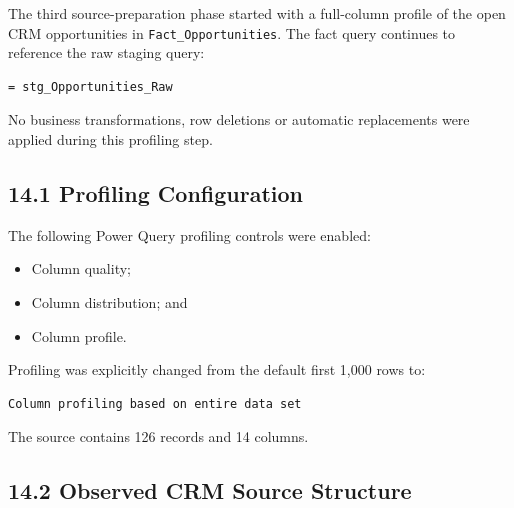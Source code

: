 \documentclass[11pt,a4paper]{article}
\begin{document}
The third source-preparation phase started with a full-column profile of the
open CRM opportunities in \texttt{Fact\_Opportunities}. The fact query
continues to reference the raw staging query:

\begin{lstlisting}[style=powerquery]
= stg_Opportunities_Raw
\end{lstlisting}

No business transformations, row deletions or automatic replacements were
applied during this profiling step.

\subsection{14.1 Profiling Configuration}

The following Power Query profiling controls were enabled:

\begin{itemize}[leftmargin=7mm,itemsep=2pt]
    \item Column quality;
    \item Column distribution; and
    \item Column profile.
\end{itemize}

Profiling was explicitly changed from the default first 1,000 rows to:

\begin{lstlisting}[style=powerquery]
Column profiling based on entire data set
\end{lstlisting}

The source contains 126 records and 14 columns.

\subsection{14.2 Observed CRM Source Structure}
\end{document}
